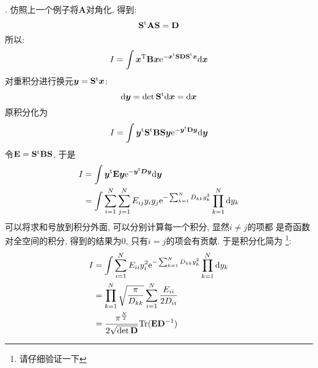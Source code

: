         . 仿照上一个例子将$\bm{A}$对角化, 得到:
        \begin{equation}
            \mathbf{S}^\mathrm{t} \mathbf{AS} = \mathbf{D}
        \end{equation}
        所以:
        \begin{equation}
            I = \int \bm{x}^\mathrm{T}\mathbf{B}\bm{x} \mathrm{e}^{-\bm{x}^\mathrm{t}\mathbf{SDS}^\mathrm{t}\bm{x}}\mathrm{d}\bm{x}
        \end{equation}
        对重积分进行换元$\bm{y} = \mathbf{S}^\mathrm{t}\bm{x}$: 
        \begin{equation}
            \mathrm{d}\bm{y} = \det\mathbf{S}^\mathrm{t}\mathrm{d}\bm{x} = \mathrm{d}\bm{x}
        \end{equation}
        原积分化为
        \begin{equation}
            \begin{aligned}
                I = \int \bm{y}^\mathrm{t}\mathbf{S}^\mathrm{t}\mathbf{BS}\bm{y}
                 \mathrm{e}^{-\bm{y}^\mathrm{t}\mathbf{D}\bm{y}}\mathrm{d}\bm{y}
            \end{aligned}
            \label{change variable}
        \end{equation}
        令$\mathbf{E} = \mathbf{S}^\mathrm{t}\mathbf{BS}$, 于是
        \begin{equation}
            \begin{aligned}
                I &= \int \bm{y}^\mathrm{t}\mathbf{E}\bm{y} \mathrm{e}^{-\bm{y}^\mathrm{t}\bm{D}\bm{y}}\mathrm{d}\bm{y}\\
                &= \int \sum_{i=1}^{N} \sum_{j=1}^{N} E_{ij} y_i y_j \mathrm{e}^{-\sum_{k=1}^{N} D_{kk} y_k^2} \prod_{k=1}^{N} \mathrm{d}y_k
            \end{aligned}
        \end{equation}
        可以将求和号放到积分外面, 可以分别计算每一个积分, 显然$i \neq j$的项都
        是奇函数对全空间的积分, 得到的结果为0, 只有$i=j$的项会有贡献. 于是积分化简为
        \footnote{请仔细验证一下}:
        \begin{equation}
            \begin{aligned}
                I &= \int \sum_{i=1}^N E_{ii} y_i^2 \mathrm{e}^{-\sum_{k=1}^{N} D_{kk} y_k^2} \prod_{k=1}^{N} \mathrm{d}y_k\\
                &= \prod_{k=1}^{N} \sqrt{\frac {\pi}{D_{kk}}} \sum_{i=1}^{N} \frac {E_{ii}}{2D_{ii}}\\
                &= \frac {\pi^{\frac N2}}{2\sqrt{\det{\mathbf{D}}}} \mathrm{Tr} (\mathbf{ED}^{-1})
            \end{aligned}
        \end{equation}
